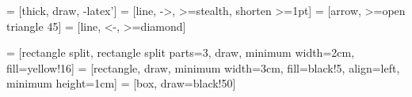   = [thick, draw, -latex']
 = [line, ->, >=stealth, shorten >=1pt]
 = [arrow, >=open triangle 45]   %
 = [line, <-, >=diamond]           %

 = [rectangle split, rectangle split parts=3, draw, minimum width=2cm, fill=yellow!16] %
 = [rectangle, draw, minimum width=3cm, fill=black!5, align=left, minimum height=1cm]
 = [box, draw=black!50]